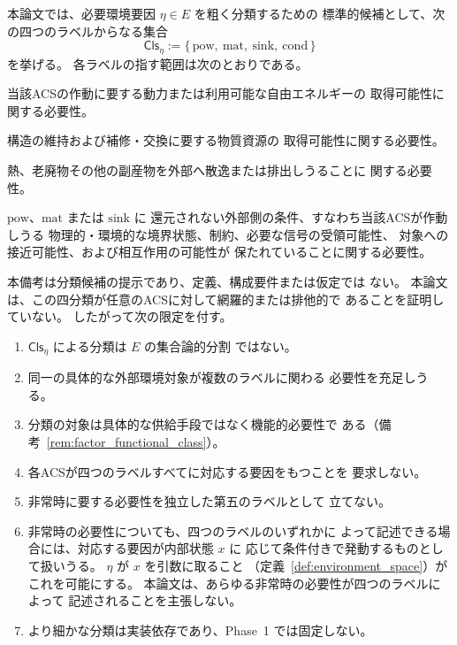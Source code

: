 \begin{remark}[必要環境要因の標準的粗分類候補]
\label{rem:eta_coarse_classes}
本論文では、必要環境要因 $\eta\in E$ を粗く分類するための
標準的候補として、次の四つのラベルからなる集合
\[
  \mathsf{Cls}_\eta
  :=
  \{\,
    \mathrm{pow},\
    \mathrm{mat},\
    \mathrm{sink},\
    \mathrm{cond}
  \,\}
\]
を挙げる。
各ラベルの指す範囲は次のとおりである。

\begin{description}[style=nextline]
  \item[$\mathrm{pow}$（動力・利用可能自由エネルギー関係）]
  当該ACSの作動に要する動力または利用可能な自由エネルギーの
  取得可能性に関する必要性。
  \item[$\mathrm{mat}$（構造・物質資源関係）]
  構造の維持および補修・交換に要する物質資源の
  取得可能性に関する必要性。
  \item[$\mathrm{sink}$（散逸・排出関係）]
  熱、老廃物その他の副産物を外部へ散逸または排出しうることに
  関する必要性。
  \item[$\mathrm{cond}$（外部作動・境界条件関係）]
  $\mathrm{pow}$、$\mathrm{mat}$ または $\mathrm{sink}$ に
  還元されない外部側の条件、すなわち当該ACSが作動しうる
  物理的・環境的な境界状態、制約、必要な信号の受領可能性、
  対象への接近可能性、および相互作用の可能性が
  保たれていることに関する必要性。
\end{description}

本備考は分類候補の提示であり、定義、構成要件または仮定では
ない。
本論文は、この四分類が任意のACSに対して網羅的または排他的で
あることを証明していない。
したがって次の限定を付す。

\begin{enumerate}[label=(\alph*)]
  \item $\mathsf{Cls}_\eta$ による分類は $E$ の集合論的分割
  ではない。
  \item 同一の具体的な外部環境対象が複数のラベルに関わる
  必要性を充足しうる。
  \item 分類の対象は具体的な供給手段ではなく機能的必要性で
  ある（備考~\ref{rem:factor_functional_class}）。
  \item 各ACSが四つのラベルすべてに対応する要因をもつことを
  要求しない。
  \item 非常時に要する必要性を独立した第五のラベルとして
  立てない。
  \item 非常時の必要性についても、四つのラベルのいずれかに
  よって記述できる場合には、対応する要因が内部状態 $x$ に
  応じて条件付きで発動するものとして扱いうる。
  $\eta$ が $x$ を引数に取ること
  （定義~\ref{def:environment_space}）がこれを可能にする。
  本論文は、あらゆる非常時の必要性が四つのラベルによって
  記述されることを主張しない。
  \item より細かな分類は実装依存であり、Phase~1 では固定しない。
\end{enumerate}


\end{remark}
